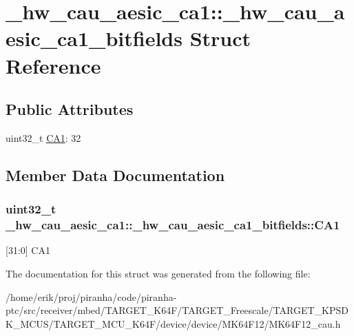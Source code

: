\hypertarget{struct__hw__cau__aesic__ca1_1_1__hw__cau__aesic__ca1__bitfields}{}\section{\+\_\+hw\+\_\+cau\+\_\+aesic\+\_\+ca1\+:\+:\+\_\+hw\+\_\+cau\+\_\+aesic\+\_\+ca1\+\_\+bitfields Struct Reference}
\label{struct__hw__cau__aesic__ca1_1_1__hw__cau__aesic__ca1__bitfields}
\subsection*{Public Attributes}
\begin{DoxyCompactItemize}
\item 
uint32\+\_\+t \hyperlink{struct__hw__cau__aesic__ca1_1_1__hw__cau__aesic__ca1__bitfields_affa7739bd40deec5411aefb6a26d83e1}{C\+A1}\+: 32
\end{DoxyCompactItemize}


\subsection{Member Data Documentation}
\subsubsection[{\texorpdfstring{C\+A1}{CA1}}]{\setlength{\rightskip}{0pt plus 5cm}uint32\+\_\+t \+\_\+hw\+\_\+cau\+\_\+aesic\+\_\+ca1\+::\+\_\+hw\+\_\+cau\+\_\+aesic\+\_\+ca1\+\_\+bitfields\+::\+C\+A1}\hypertarget{struct__hw__cau__aesic__ca1_1_1__hw__cau__aesic__ca1__bitfields_affa7739bd40deec5411aefb6a26d83e1}{}\label{struct__hw__cau__aesic__ca1_1_1__hw__cau__aesic__ca1__bitfields_affa7739bd40deec5411aefb6a26d83e1}
\mbox{[}31\+:0\mbox{]} C\+A1 

The documentation for this struct was generated from the following file\+:\begin{DoxyCompactItemize}
\item 
/home/erik/proj/piranha/code/piranha-\/ptc/src/receiver/mbed/\+T\+A\+R\+G\+E\+T\+\_\+\+K64\+F/\+T\+A\+R\+G\+E\+T\+\_\+\+Freescale/\+T\+A\+R\+G\+E\+T\+\_\+\+K\+P\+S\+D\+K\+\_\+\+M\+C\+U\+S/\+T\+A\+R\+G\+E\+T\+\_\+\+M\+C\+U\+\_\+\+K64\+F/device/device/\+M\+K64\+F12/M\+K64\+F12\+\_\+cau.\+h\end{DoxyCompactItemize}
